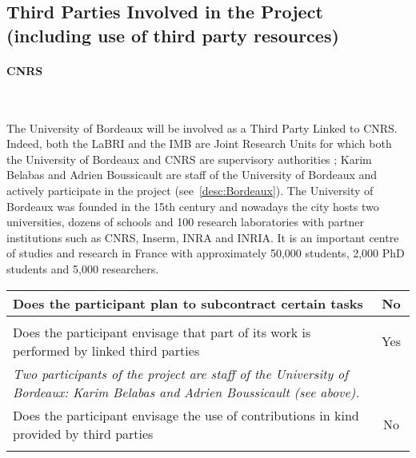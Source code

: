 
\subsection{Third Parties Involved in the Project (including use of third party resources)}
\label{section:ThirdParties}

\paragraph{CNRS}\ 


The University of Bordeaux will be involved as a Third Party Linked to CNRS.
Indeed, both the LaBRI and the IMB are Joint Research Units for which both the
University of Bordeaux and CNRS are supervisory authorities ; Karim Belabas and
Adrien Boussicault are staff of the University of Bordeaux and actively
participate in the project (see~\ref{desc:Bordeaux}).
The University of
Bordeaux was founded in the 15th century and nowadays the city hosts two
universities, dozens of schools and 100 research laboratories with partner
institutions such as CNRS, Inserm, INRA and INRIA. It is an important centre of
studies and research in France with approximately 50,000 students, 2,000 PhD
students and 5,000 researchers.

\smallskip

\bgroup
\def\arraystretch{1.5}  %
\noindent \begin{tabular}{|p{}|c|}
\hline
Does the participant plan to subcontract certain
tasks & No \\
\hline
\multicolumn{2}{|l|}{} \\
\hline
Does the participant envisage that part of its work
is performed by linked third parties & Yes \\
\hline
\multicolumn{2}{|l|}{\textit{Two participants of the project are staff of the University of Bordeaux: Karim Belabas and Adrien Boussicault (see above).}} \\
\hline
Does the participant envisage the use of
contributions in kind provided by
third parties & No \\
\hline
\multicolumn{2}{|l|}{} \\
\hline
\end{tabular}
\egroup

